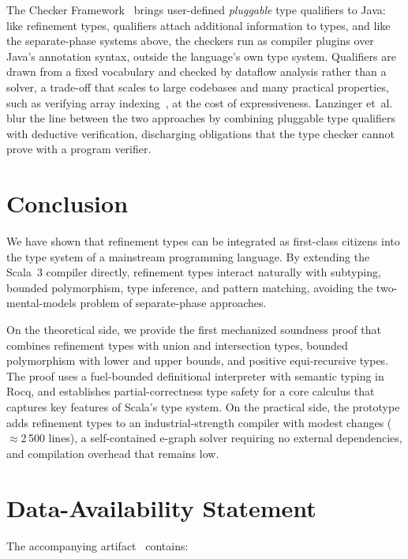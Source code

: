 \documentclass[acmsmall]{acmart}
\begin{document}
The Checker Framework~\cite{dietl2011} brings user-defined \emph{pluggable} type qualifiers to Java: like refinement types, qualifiers attach additional information to types, and like the separate-phase systems above, the checkers run as compiler plugins over Java's annotation syntax, outside the language's own type system. Qualifiers are drawn from a fixed vocabulary and checked by dataflow analysis rather than a solver, a trade-off that scales to large codebases and many practical properties, such as verifying array indexing~\cite{kellogg2018}, at the cost of expressiveness. Lanzinger et~al.~\cite{lanzinger2021} blur the line between the two approaches by combining pluggable type qualifiers with deductive verification, discharging obligations that the type checker cannot prove with a program verifier.

\section{Conclusion}\label{sec:conclusion}

We have shown that refinement types can be integrated as first-class citizens into the type system of a mainstream programming language. By extending the Scala~3 compiler directly, refinement types interact naturally with subtyping, bounded polymorphism, type inference, and pattern matching, avoiding the two-mental-models problem of separate-phase approaches.

On the theoretical side, we provide the first mechanized soundness proof that combines refinement types with union and intersection types, bounded polymorphism with lower and upper bounds, and positive equi-recursive types. The proof uses a fuel-bounded definitional interpreter with semantic typing in Rocq, and establishes partial-correctness type safety for a core calculus that captures key features of Scala's type system. On the practical side, the prototype adds refinement types to an industrial-strength compiler with modest changes ($\approx$2\,500 lines), a self-contained e-graph solver requiring no external dependencies, and compilation overhead that remains low.


\FloatBarrier

\clearpage

\section*{Data-Availability Statement}

The accompanying artifact~\cite{bovel_2026_21737784} contains:
\end{document}
